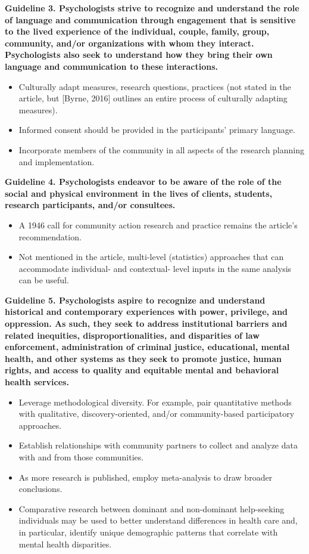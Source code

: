 \documentclass[
  english,
]{book}
\providecommand{\tightlist}{%
  \setlength{\itemsep}{0pt}\setlength{\parskip}{0pt}}
\begin{document}
\textbf{Guideline 3. Psychologists strive to recognize and understand the role of language and communication through engagement that is sensitive to the lived experience of the individual, couple, family, group, community, and/or organizations with whom they interact. Psychologists also seek to understand how they bring their own language and communication to these interactions.}

\begin{itemize}
\tightlist
\item
  Culturally adapt measures, research questions, practices (not stated in the article, but {[}Byrne, 2016{]} outlines an entire process of culturally adapting measures).
\item
  Informed consent should be provided in the participants' primary language.
\item
  Incorporate members of the community in all aspects of the research planning and implementation.
\end{itemize}

\textbf{Guideline 4. Psychologists endeavor to be aware of the role of the social and physical environment in the lives of clients, students, research participants, and/or consultees.}

\begin{itemize}
\tightlist
\item
  A 1946 call for community action research and practice remains the article's recommendation.
\item
  Not mentioned in the article, multi-level (statistics) approaches that can accommodate individual- and contextual- level inputs in the same analysis can be useful.
\end{itemize}

\textbf{Guideline 5. Psychologists aspire to recognize and understand historical and contemporary experiences with power, privilege, and oppression. As such, they seek to address institutional barriers and related inequities, disproportionalities, and disparities of law enforcement, administration of criminal justice, educational, mental health, and other systems as they seek to promote justice, human rights, and access to quality and equitable mental and behavioral health services.}

\begin{itemize}
\tightlist
\item
  Leverage methodological diversity. For example, pair quantitative methods with qualitative, discovery-oriented, and/or community-based participatory approaches.
\item
  Establish relationships with community partners to collect and analyze data with and from those communities.
\item
  As more research is published, employ meta-analysis to draw broader conclusions.
\item
  Comparative research between dominant and non-dominant help-seeking individuals may be used to better understand differences in health care and, in particular, identify unique demographic patterns that correlate with mental health disparities.
\end{itemize}
\end{document}

